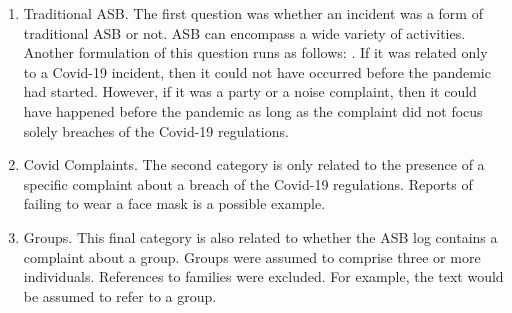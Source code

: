 \begin{enumerate}
\item{Traditional ASB.} The first question was whether an incident was a form of traditional ASB or not. ASB can encompass a wide variety of activities. Another formulation of this question runs as follows: . If it was related only to a Covid-19 incident, then it could not have occurred before the pandemic had started. However, if it was a party or a noise complaint, then it could have happened before the pandemic as long as the complaint did not focus solely breaches of the Covid-19 regulations.

\item{Covid Complaints.} The second category is only related to the presence of a specific complaint about a breach of the Covid-19 regulations. Reports of failing to wear a face mask is a possible example.

\item{Groups.} This final category is also related to whether the ASB log contains a complaint about a group. Groups were assumed to comprise three or more individuals. References to families were excluded. For example, the text  would be assumed to refer to a group.

\end{enumerate}


